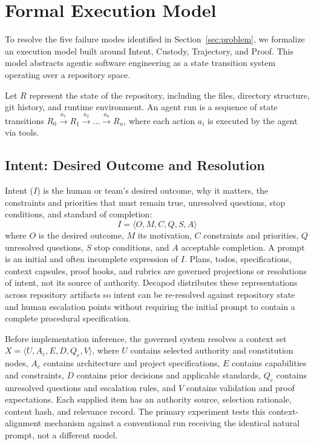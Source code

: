 \section{Formal Execution Model}
\label{sec:model}

To resolve the five failure modes identified in Section~\ref{sec:problem}, we formalize an execution model built around Intent, Custody, Trajectory, and Proof. This model abstracts agentic software engineering as a state transition system operating over a repository space.

Let $R$ represent the state of the repository, including the files, directory structure, git history, and runtime environment. An agent run is a sequence of state transitions $R_0 \xrightarrow{a_1} R_1 \xrightarrow{a_2} \dots \xrightarrow{a_n} R_n$, where each action $a_i$ is executed by the agent via tools.

\subsection{Intent: Desired Outcome and Resolution}
Intent ($I$) is the human or team's desired outcome, why it matters, the constraints and priorities that must remain true, unresolved questions, stop conditions, and standard of completion:
$$I = \langle O, M, C, Q, S, A \rangle$$
where $O$ is the desired outcome, $M$ its motivation, $C$ constraints and priorities, $Q$ unresolved questions, $S$ stop conditions, and $A$ acceptable completion. A prompt is an initial and often incomplete expression of $I$. Plans, todos, specifications, context capsules, proof hooks, and rubrics are governed projections or resolutions of intent, not its source of authority. Decapod distributes these representations across repository artifacts so intent can be re-resolved against repository state and human escalation points without requiring the initial prompt to contain a complete procedural specification.

Before implementation inference, the governed system resolves a context set $X = \langle U, A_e, E, D, Q_e, V \rangle$, where $U$ contains selected authority and constitution nodes, $A_e$ contains architecture and project specifications, $E$ contains capabilities and constraints, $D$ contains prior decisions and applicable standards, $Q_e$ contains unresolved questions and escalation rules, and $V$ contains validation and proof expectations. Each supplied item has an authority source, selection rationale, content hash, and relevance record. The primary experiment tests this context-alignment mechanism against a conventional run receiving the identical natural prompt, not a different model.

